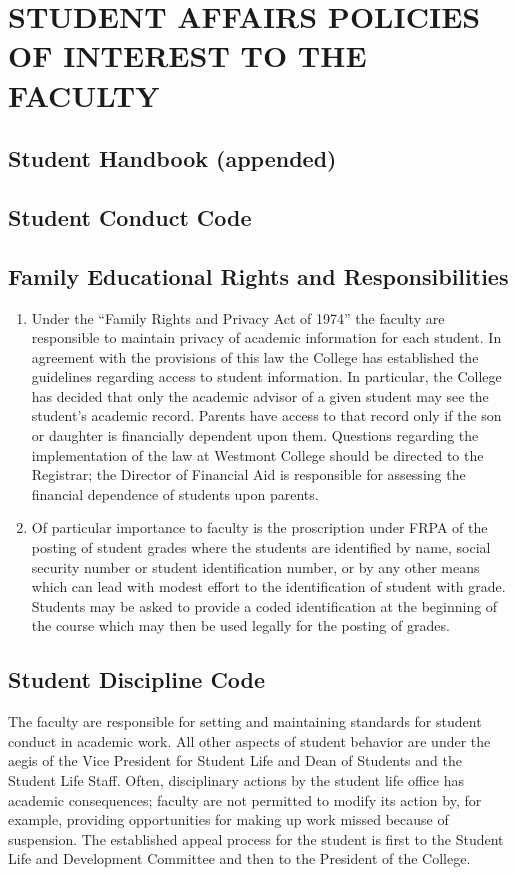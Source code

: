 
\section{STUDENT AFFAIRS POLICIES OF INTEREST TO THE FACULTY}
	\subsection{Student Handbook (appended)}
	\subsection{Student Conduct Code}
	\subsection{Family Educational Rights and Responsibilities}
		\begin{enumerate}[label=\alph*)]
			\item{Under the ``Family Rights and Privacy Act of 1974'' the faculty are responsible to maintain privacy of academic information for each student.  In agreement with the provisions of this law the College has established the guidelines regarding access to student information.  In particular, the College has decided that only the academic advisor of a given student may see the student's academic record.  Parents have access to that record only if the son or daughter is financially dependent upon them.  Questions regarding the implementation of the law at Westmont College should be directed to the Registrar; the Director of Financial Aid is responsible for assessing the financial dependence of students upon parents.
			}

			\item{Of particular importance to faculty is the proscription under FRPA of the posting of student grades where the students are identified by name, social security number or student identification number, or by any other means which can lead with modest effort to the identification of student with grade.  Students may be asked to provide a coded identification at the beginning of the course which may then be used legally for the posting of grades.
			}
		\end{enumerate}
	\subsection{Student Discipline Code}
		The faculty are responsible for setting and maintaining standards for student conduct in academic work.  All other aspects of student behavior are under the aegis of the Vice President for Student Life and Dean of Students and the Student Life Staff.  Often, disciplinary actions by the student life office has academic consequences; faculty are not permitted to modify its action by, for example, providing opportunities for making up work missed because of suspension.  The established appeal process for the student is first to the Student Life and Development Committee and then to the President of the College.
